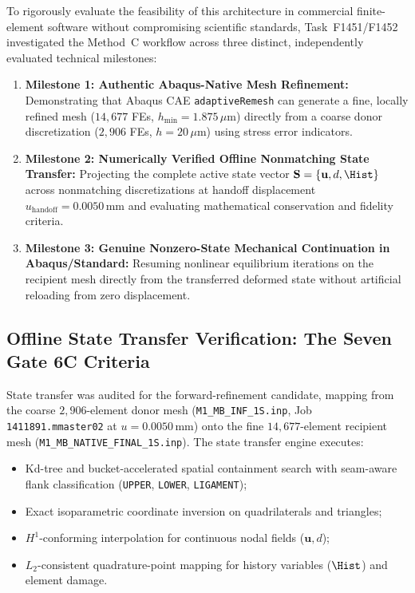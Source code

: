 \begin{enumerate}
To rigorously evaluate the feasibility of this architecture in commercial finite-element software without compromising scientific standards, Task~F1451/F1452 investigated the Method~C workflow across three distinct, independently evaluated technical milestones:
\begin{enumerate}
  \item \textbf{Milestone 1: Authentic Abaqus-Native Mesh Refinement:} Demonstrating that Abaqus CAE \texttt{adaptiveRemesh} can generate a fine, locally refined mesh ($14{,}677$ FEs, $h_{\min} = 1.875\,\mu\mathrm{m}$) directly from a coarse donor discretization ($2{,}906$ FEs, $h = 20\,\mu\mathrm{m}$) using stress error indicators.
  \item \textbf{Milestone 2: Numerically Verified Offline Nonmatching State Transfer:} Projecting the complete active state vector $\mathbf{S} = \{\mathbf{u}, d, \Hist\}$ across nonmatching discretizations at handoff displacement $u_{\mathrm{handoff}} = 0.0050\,\mathrm{mm}$ and evaluating mathematical conservation and fidelity criteria.
  \item \textbf{Milestone 3: Genuine Nonzero-State Mechanical Continuation in Abaqus/Standard:} Resuming nonlinear equilibrium iterations on the recipient mesh directly from the transferred deformed state without artificial reloading from zero displacement.
\end{enumerate}

\subsection{Offline State Transfer Verification: The Seven Gate 6C Criteria}
\label{subsec:method_c_offline_transfer_criteria}

State transfer was audited for the forward-refinement candidate, mapping from the coarse $2{,}906$-element donor mesh (\texttt{M1\_MB\_INF\_1S.inp}, Job \texttt{1411891.mmaster02} at $u = 0.0050\,\mathrm{mm}$) onto the fine $14{,}677$-element recipient mesh (\texttt{M1\_MB\_NATIVE\_FINAL\_1S.inp}). The state transfer engine executes:
\begin{itemize}
  \item Kd-tree and bucket-accelerated spatial containment search with seam-aware flank classification (\texttt{UPPER}, \texttt{LOWER}, \texttt{LIGAMENT});
  \item Exact isoparametric coordinate inversion on quadrilaterals and triangles;
  \item $H^1$-conforming interpolation for continuous nodal fields ($\mathbf{u}, d$);
  \item $L_2$-consistent quadrature-point mapping for history variables ($\Hist$) and element damage.
\end{itemize}


\end{enumerate}
